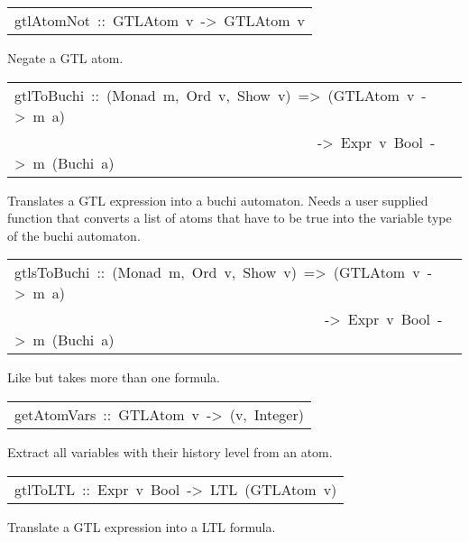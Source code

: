 \begin{haddockdesc}
\item[\begin{tabular}{@{}l}
gtlAtomNot\ ::\ GTLAtom\ v\ ->\ GTLAtom\ v
\end{tabular}]\haddockbegindoc
Negate a GTL atom.
\par

\end{haddockdesc}
\begin{haddockdesc}
\item[\begin{tabular}{@{}l}
gtlToBuchi\ ::\ (Monad\ m,\ Ord\ v,\ Show\ v)\ =>\ ({\char 91}GTLAtom\ v{\char 93}\ ->\ m\ a)\\\ \ \ \ \ \ \ \ \ \ \ \ \ \ \ \ \ \ \ \ \ \ \ \ \ \ \ \ \ \ \ \ \ \ \ \ \ \ \ \ \ \ ->\ Expr\ v\ Bool\ ->\ m\ (Buchi\ a)
\end{tabular}]\haddockbegindoc
Translates a GTL expression into a buchi automaton.
   Needs a user supplied function that converts a list of atoms that have to be
   true into the variable type of the buchi automaton.
\par

\end{haddockdesc}
\begin{haddockdesc}
\item[\begin{tabular}{@{}l}
gtlsToBuchi\ ::\ (Monad\ m,\ Ord\ v,\ Show\ v)\ =>\ ({\char 91}GTLAtom\ v{\char 93}\ ->\ m\ a)\\\ \ \ \ \ \ \ \ \ \ \ \ \ \ \ \ \ \ \ \ \ \ \ \ \ \ \ \ \ \ \ \ \ \ \ \ \ \ \ \ \ \ \ ->\ {\char 91}Expr\ v\ Bool{\char 93}\ ->\ m\ (Buchi\ a)
\end{tabular}]\haddockbegindoc
Like  but takes more than one formula.
\par

\end{haddockdesc}
\begin{haddockdesc}
\item[\begin{tabular}{@{}l}
getAtomVars\ ::\ GTLAtom\ v\ ->\ {\char 91}(v,\ Integer){\char 93}
\end{tabular}]\haddockbegindoc
Extract all variables with their history level from an atom.
\par

\end{haddockdesc}
\begin{haddockdesc}
\item[\begin{tabular}{@{}l}
gtlToLTL\ ::\ Expr\ v\ Bool\ ->\ LTL\ (GTLAtom\ v)
\end{tabular}]\haddockbegindoc
Translate a GTL expression into a LTL formula.
\par

\end{haddockdesc}